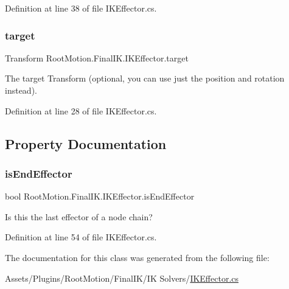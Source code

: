 Definition at line 38 of file I\+K\+Effector.\+cs.

\mbox{\label{class_root_motion_1_1_final_i_k_1_1_i_k_effector_af489d67b5329c6f7ca15b27e497cf0b5}} 
\subsubsection{\texorpdfstring{target}{target}}
{\footnotesize\ttfamily Transform Root\+Motion.\+Final\+I\+K.\+I\+K\+Effector.\+target}



The target Transform (optional, you can use just the position and rotation instead). 



Definition at line 28 of file I\+K\+Effector.\+cs.



\subsection{Property Documentation}
\mbox{\label{class_root_motion_1_1_final_i_k_1_1_i_k_effector_ac6504b5ec6271aacdc2a7d8cbd2adcb6}} 
\subsubsection{\texorpdfstring{is\+End\+Effector}{isEndEffector}}
{\footnotesize\ttfamily bool Root\+Motion.\+Final\+I\+K.\+I\+K\+Effector.\+is\+End\+Effector\hspace{0.3cm}{\ttfamily [get]}}



Is this the last effector of a node chain? 



Definition at line 54 of file I\+K\+Effector.\+cs.



The documentation for this class was generated from the following file\+:\begin{DoxyCompactItemize}
\item 
Assets/\+Plugins/\+Root\+Motion/\+Final\+I\+K/\+I\+K Solvers/\mbox{\hyperlink{_i_k_effector_8cs}{I\+K\+Effector.\+cs}}\end{DoxyCompactItemize}
